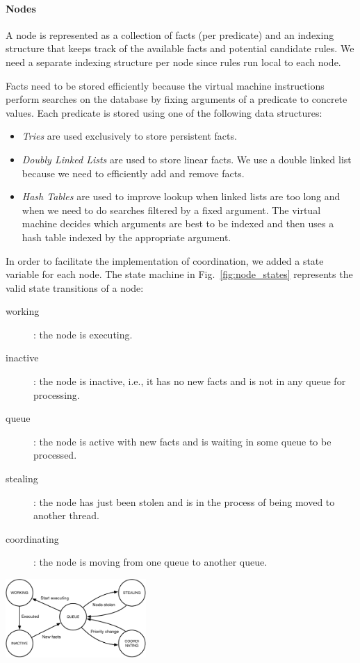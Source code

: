 \paragraph{Nodes} 
A node is represented as a collection of facts (per predicate) and an indexing structure that
keeps track of the available facts and potential candidate rules. We need
a separate indexing structure per node since rules run local to each node.

Facts need to be stored efficiently because the virtual machine instructions
perform searches on the database by fixing arguments of a predicate to concrete
values. Each predicate is stored using one of the following data structures:

\begin{itemize}
\item \emph{Tries} are used exclusively to store persistent facts.
\item \emph{Doubly Linked Lists} are used to store 
  linear facts. We use a double linked list because we need to efficiently add
  and remove facts.
\item \emph{Hash Tables} are used to improve lookup when 
  linked lists are too long and when we need to do searches filtered by
  a fixed argument. The virtual machine decides which arguments are
  best to be indexed and then uses a hash table
  indexed by the appropriate argument.
\end{itemize}

In order to facilitate the implementation of coordination, we added a state
variable for each node. The state machine in
Fig.~\ref{fig:node_states} represents the valid state transitions of a node:

\begin{description}
   \item[working]: the node is executing.
   \item[inactive]: the node is inactive, i.e., it has no new facts and is not in any
   queue for processing.
   \item[queue]: the node is active with new facts and is waiting in some queue
   to be processed.
   \item[stealing]: the node has just been stolen and is in the process of being
   moved to another thread.
   \item[coordinating]: the node is moving from one queue to another queue.
\end{description}

\begin{topfig}
   \centering
   \includegraphics[width=0.4\textwidth]{node_states.pdf}
\end{topfig}

